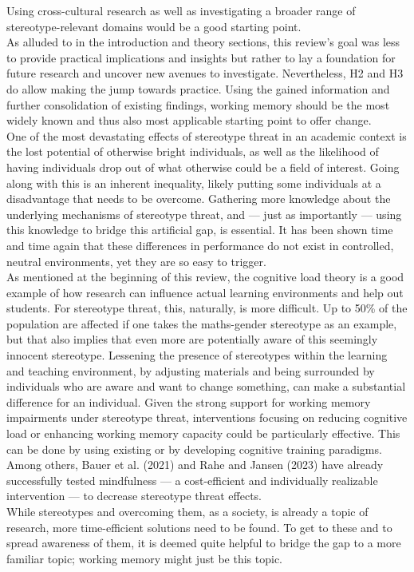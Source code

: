 \documentclass[
  stu, a4paper, 12pt,mask,floatsintext]{apa7}
\begin{document}
Using cross-cultural research as well as investigating a broader range of stereotype-relevant domains would be a good starting point.\\
As alluded to in the introduction and theory sections, this review's goal was less to provide practical implications and insights but rather to lay a foundation for future research and uncover new avenues to investigate.
Nevertheless, H2 and H3 do allow making the jump towards practice.
Using the gained information and further consolidation of existing findings, working memory should be the most widely known and thus also most applicable starting point to offer change.\\
One of the most devastating effects of stereotype threat in an academic context is the lost potential of otherwise bright individuals, as well as the likelihood of having individuals drop out of what otherwise could be a field of interest.
Going along with this is an inherent inequality, likely putting some individuals at a disadvantage that needs to be overcome.
Gathering more knowledge about the underlying mechanisms of stereotype threat, and --- just as importantly --- using this knowledge to bridge this artificial gap, is essential.
It has been shown time and time again that these differences in performance do not exist in controlled, neutral environments, yet they are so easy to trigger.\\
As mentioned at the beginning of this review, the cognitive load theory is a good example of how research can influence actual learning environments and help out students.
For stereotype threat, this, naturally, is more difficult.
Up to 50\% of the population are affected if one takes the maths-gender stereotype as an example, but that also implies that even more are potentially aware of this seemingly innocent stereotype.
Lessening the presence of stereotypes within the learning and teaching environment, by adjusting materials and being surrounded by individuals who are aware and want to change something, can make a substantial difference for an individual.
Given the strong support for working memory impairments under stereotype threat, interventions focusing on reducing cognitive load or enhancing working memory capacity could be particularly effective.
This can be done by using existing or by developing cognitive training paradigms.
Among others, Bauer et al. (2021) and Rahe and Jansen (2023) have already successfully tested mindfulness --- a cost-efficient and individually realizable intervention --- to decrease stereotype threat effects.\\
While stereotypes and overcoming them, as a society, is already a topic of research, more time-efficient solutions need to be found.
To get to these and to spread awareness of them, it is deemed quite helpful to bridge the gap to a more familiar topic; working memory might just be this topic.
\end{document}
